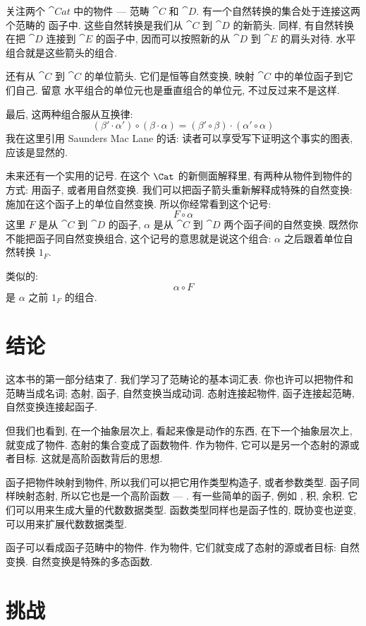 \noindent
关注两个 $\cat{Cat}$ 中的物件 --- 范畴 $\cat{C}$ 和 $\cat{D}$. 有一个自然转换的集合处于连接这两个范畴的
函子中. 这些自然转换是我们从 $\cat{C}$ 到 $\cat{D}$ 的新箭头. 同样, 有自然转换在把 $\cat{D}$ 连接到 $\cat{E}$
的函子中, 因而可以按照新的从 $\cat{D}$ 到 $\cat{E}$ 的肩头对待. 水平组合就是这些箭头的组合.

还有从 $\cat{C}$ 到 $\cat{C}$ 的单位箭头. 它们是恒等自然变换, 映射 $\cat{C}$ 中的单位函子到它们自己. 留意
水平组合的单位元也是垂直组合的单位元, 不过反过来不是这样.

最后, 这两种组合服从互换律:
\[(\beta' \cdot \alpha') \circ (\beta \cdot \alpha) = (\beta' \circ \beta) \cdot (\alpha' \circ \alpha)\]
我在这里引用 Saunders Mac Lane 的话: 读者可以享受写下证明这个事实的图表, 应该是显然的.

未来还有一个实用的记号. 在这个 $\Cat$ 的新侧面解释里, 有两种从物件到物件的方式: 用函子, 或者用自然变换.
我们可以把函子箭头重新解释成特殊的自然变换: 施加在这个函子上的单位自然变换. 所以你经常看到这个记号:
\[F \circ \alpha\]
这里 $F$ 是从 $\cat{C}$ 到 $\cat{D}$ 的函子, $\alpha$ 是从 $\cat{C}$ 到 $\cat{D}$ 两个函子间的自然变换.
既然你不能把函子同自然变换组合, 这个记号的意思就是说这个组合: $\alpha$ 之后跟着单位自然转换 $1_F$.

类似的:
\[\alpha \circ F\]
是 $\alpha$ 之前 $1_F$ 的组合.

\section{结论}

这本书的第一部分结束了. 我们学习了范畴论的基本词汇表. 你也许可以把物件和范畴当成名词; 态射, 函子, 自然变换当成动词.
态射连接起物件, 函子连接起范畴, 自然变换连接起函子.

但我们也看到, 在一个抽象层次上, 看起来像是动作的东西, 在下一个抽象层次上, 就变成了物件. 态射的集合变成了函数物件.
作为物件, 它可以是另一个态射的源或者目标. 这就是高阶函数背后的思想.

函子把物件映射到物件, 所以我们可以把它用作类型构造子, 或者参数类型. 函子同样映射态射, 所以它也是一个高阶函数
 --- . 有一些简单的函子, 例如 , 积, 余积. 它们可以用来生成大量的代数数据类型.
 函数类型同样也是函子性的, 既协变也逆变, 可以用来扩展代数数据类型.

函子可以看成函子范畴中的物件. 作为物件, 它们就变成了态射的源或者目标: 自然变换. 自然变换是特殊的多态函数.


\section{挑战}

